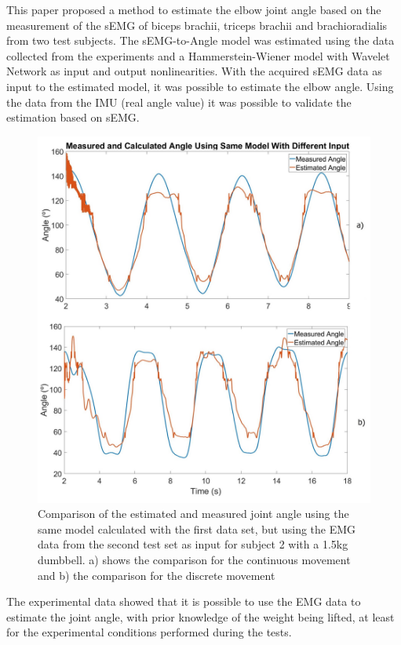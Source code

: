 \documentclass[letterpaper, 10 pt, conference]{ieeeconf}  %
\begin{document}
This paper proposed a method to estimate the elbow joint angle based on the measurement of the sEMG of biceps brachii, triceps brachii and brachioradialis from two test subjects. The sEMG-to-Angle model was estimated using the data collected from the experiments and a Hammerstein-Wiener model with Wavelet Network as input and output nonlinearities. With the acquired sEMG data as input to the estimated model, it was possible to estimate the elbow angle. Using the data from the IMU (real angle value) it was possible to validate the estimation based on sEMG.

\begin{figure}[bthp]
      \centering
      \includegraphics[width=0.95\columnwidth]{Images/Different_Input.jpg}
      \caption{Comparison of the estimated and measured joint angle using the same model calculated with the first data set, but using the EMG data from the second test set as input for subject 2 with a 1.5kg dumbbell. a) shows the comparison for the continuous movement and b) the comparison for the discrete movement}
      \label{Validation Procedure}
   \end{figure}

The experimental data showed that it is possible to use the EMG data to estimate the joint angle, with prior knowledge of the weight being lifted, at least for the experimental conditions performed during the tests.
\end{document}
